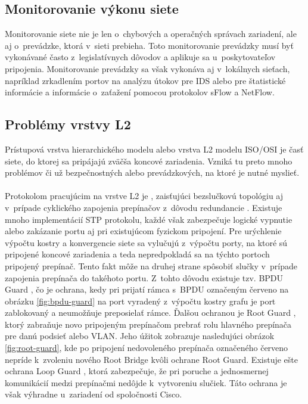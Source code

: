 \subsection{Monitorovanie výkonu siete}
Monitorovanie siete nie je len o~chybových a operačných správach zariadení, ale aj o~prevádzke, ktorá v~sieti prebieha. Toto monitorovanie prevádzky musí byť vykonávané často z~legislatívnych dôvodov a aplikuje sa u~poskytovateľov pripojenia. Monitorovanie prevádzky sa však vykonáva aj v~lokálnych sieťach, napríklad zrkadlením portov \cite{Singh2018} na analýzu útokov pre IDS alebo pre štatistické informácie a informácie o~zaťažení pomocou protokolov sFlow a NetFlow.

\subsection{Problémy vrstvy L2}
Prístupová vrstva hierarchického modelu alebo vrstva L2 modelu ISO/OSI je časť siete, do ktorej sa pripájajú zväčša koncové zariadenia. Vzniká tu preto mnoho problémov či už bezpečnostných alebo prevádzkových, na ktoré je nutné myslieť.
\\\\   
\noindent
Protokolom pracujúcim na vrstve L2 je , zaisťujúci bezslučkovú topológiu aj v~prípade cyklického zapojenia prepínačov z~dôvodu redundancie \cite{Lammle2013}. Existuje mnoho implementácií STP protokolu, každé však zabezpečuje logické vypnutie alebo zakázanie portu aj pri existujúcom fyzickom pripojení. Pre urýchlenie výpočtu kostry a konvergencie siete sa vylučujú z~výpočtu porty, na ktoré sú pripojené koncové zariadenia a teda nepredpokladá sa na týchto portoch pripojený prepínač. Tento fakt môže na druhej strane spôsobiť slučky v~prípade zapojenia prepínača do takéhoto portu. Z~tohto dôvodu existuje tzv. BPDU Guard \cite{Lammle2013}, čo je ochrana, kedy pri prijatí rámca s~BPDU označeným červeno na obrázku  \ref{fig:bpdu-guard} na port vyradený z~výpočtu kostry grafu je port zablokovaný a neumožňuje preposielať rámce. Ďalšou ochranou je Root Guard \cite{Vyncke2008}, ktorý zabraňuje novo pripojeným prepínačom prebrať rolu hlavného prepínača pre danú podsieť alebo VLAN. Jeho úžitok zobrazuje nasledujúci obrázok \ref{fig:root-guard}, kde po pripojení nedovoleného prepínača označeného červeno nepríde k~zvoleniu nového Root Bridge kvôli ochrane Root Guard. Existuje ešte ochrana Loop Guard \cite{Vyncke2008}, ktorá zabezpečuje, že pri poruche a jednosmernej komunikácií medzi prepínačmi nedôjde k~vytvoreniu slučiek. Táto ochrana je však výhradne u~zariadení od spoločnosti Cisco. 


